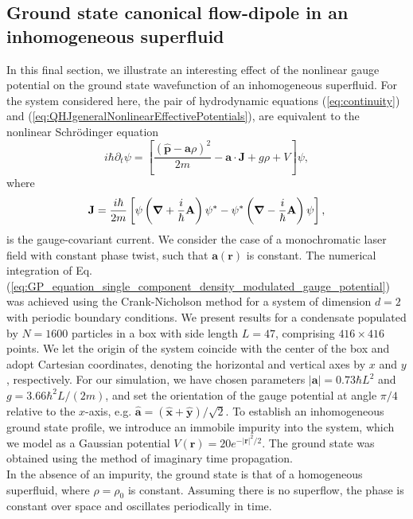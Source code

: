 \documentclass[twocolumn, nofootinbib, nobibnotes, amsmath,amssymb,aps, pra, floatfix]{revtex4-1}
\renewcommand{\v}[1]{\ensuremath{\mathbf{#1}}} %
\newcommand{\gv}[1]{\ensuremath{\mbox{\boldmath$ #1 $}}} %
\newcommand{\uv}[1]{\ensuremath{\mathbf{\hat{#1}}}} %
\newcommand{\abs}[1]{\left| #1 \right|} %
\newcommand{\grad}[1]{\gv{\nabla} #1} %
\begin{document}
\subsection{Ground state canonical flow-dipole in an inhomogeneous superfluid}
In this final section, we illustrate an interesting effect of the nonlinear gauge potential on the ground state wavefunction of an inhomogeneous superfluid.
For the system considered here, the pair of hydrodynamic equations (\ref{eq:continuity}) and (\ref{eq:QHJgeneralNonlinearEffectivePotentials}), are equivalent to the nonlinear Schr\"odinger equation
\begin{equation}
  i\hbar\partial_t\psi=\left[ \frac{\left(\hat{\v{p}}-\v{a}\rho\right)^2}{2m}-\v{a}\cdot\v{J}+g\rho+V \right]\psi,
  \label{eq:GP_equation_single_component_density_modulated_gauge_potential}
\end{equation}
where 
\begin{equation}
  \v{J}=\frac{i\hbar}{2m}\left[ \psi\left( \grad{}+\frac{i}{\hbar}\v{A} \right)\psi^*-\psi^*\left( \grad{}-\frac{i}{\hbar}\v{A} \right)\psi \right],
  \label{eq:currentDensityGaugeCovariant}
\end{equation}
is the gauge-covariant current.
We consider the case of a monochromatic laser field with constant phase twist, such that $\v{a}\left( \v{r} \right)$ is constant.
The numerical integration of Eq. (\ref{eq:GP_equation_single_component_density_modulated_gauge_potential}) was achieved using the Crank-Nicholson method for a system of dimension $d=2$ with periodic boundary conditions.
We present results for a condensate populated by $N=1600$ particles in a box with side length $L=47$, comprising $416\times 416$ points.
We let the origin of the system coincide with the center of the box and adopt Cartesian coordinates, denoting the horizontal and vertical axes by $x$ and $y$, respectively.
For our simulation, we have chosen parameters $\abs{\v{a}}=0.73\hbar L^2$ and $g=3.66 \hbar^2 L/\left( 2m \right)$, and set the orientation of the gauge potential at angle $\pi/4$ relative to the $x$-axis, e.g. $\uv{a}=\left( \uv{x}+\uv{y} \right)/\sqrt{2}$.
To establish an inhomogeneous ground state profile, we introduce an immobile impurity into the system, which we model as a Gaussian potential $V\left( \v{r} \right)=20e^{-\abs{\v{r}}^2/2}$.
The ground state was obtained using the method of imaginary time propagation.
\\
In the absence of an impurity, the ground state is that of a homogeneous superfluid, where $\rho=\rho_0$ is constant.
Assuming there is no superflow, the phase is constant over space and oscillates periodically in time. 
\end{document}
